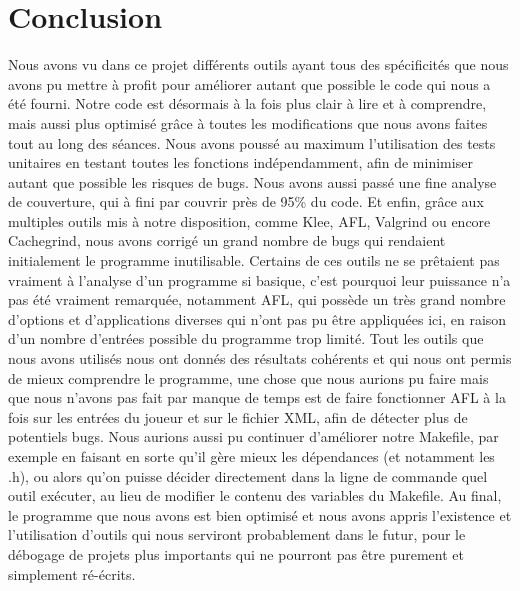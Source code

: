 \documentclass{report}
\begin{document}
\chapter{Conclusion}
Nous avons vu dans ce projet différents outils ayant tous des spécificités que nous avons pu mettre à profit pour améliorer autant que possible le code qui nous a été fourni.
\newline
Notre code est désormais à la fois plus clair à lire et à comprendre, mais aussi plus optimisé grâce à toutes les modifications que nous avons faites tout au long des séances.
\newline
Nous avons poussé au maximum l'utilisation des tests unitaires en testant toutes les fonctions indépendamment, afin de minimiser autant que possible les risques de bugs.
\newline 
Nous avons aussi passé une fine analyse de couverture, qui à fini par couvrir près de 95\% du code.
\newline 
Et enfin, grâce aux multiples outils mis à notre disposition, comme Klee, AFL, Valgrind ou encore Cachegrind, nous avons corrigé un grand nombre de bugs qui rendaient initialement le programme inutilisable.
\newline
Certains de ces outils ne se prêtaient pas vraiment à l'analyse d'un programme si basique, c'est pourquoi leur puissance n'a pas été vraiment remarquée, notamment AFL, qui possède un très grand nombre d'options et d'applications diverses qui n'ont pas pu être appliquées ici, en raison d'un nombre d'entrées possible du programme trop limité. 
\newline
Tout les outils que nous avons utilisés nous ont donnés des résultats cohérents et qui nous ont permis de mieux comprendre le programme, une chose que nous aurions pu faire mais que nous n'avons pas fait par manque de temps est de faire fonctionner AFL à la fois sur les entrées du joueur et sur le fichier XML, afin de détecter plus de potentiels bugs.
Nous aurions aussi pu continuer d'améliorer notre Makefile, par exemple en faisant en sorte qu'il gère mieux les dépendances (et notamment les .h), ou alors qu'on puisse décider directement dans la ligne de commande quel outil exécuter, au lieu de modifier le contenu des variables du Makefile.
\newline  
Au final, le programme que nous avons est bien optimisé et nous avons appris l'existence et l'utilisation d'outils qui nous serviront probablement dans le futur, pour le débogage de projets plus importants qui ne pourront pas être purement et simplement ré-écrits.














 
\end{document}

